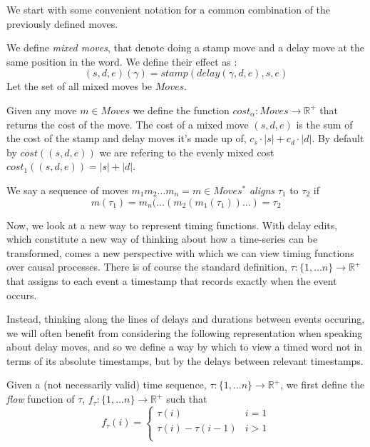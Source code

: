 \documentclass[runningheads]{llncs}
\newcounter{cases}
\begin{document}
	We start with some convenient notation for a common combination of the previously defined moves. 
	
	\begin{definition}
		We define \textit{mixed moves}, that denote doing a stamp move and a delay move at the same position in the word. 
		We define their effect as : $$(s, d, e)(\gamma) = stamp(delay(\gamma, d, e), s, e)$$
		Let the set of all mixed moves be $Moves$. 
	\end{definition}
	
	Given any move $m \in Moves$ we define the function $cost_{\alpha} : Moves \to \mathbb{R}^+$ that returns the cost of the move.  
	The cost of a mixed move $(s, d, e)$ is the sum of the cost of the stamp and delay moves it's made up of, $c_s\cdot|s| + c_d \cdot|d|$.
	By default by $cost((s, d, e))$ we are refering to the evenly mixed cost $cost_1((s, d, e)) = |s| + |d|$. 

	We say a sequence of moves $m_1m_2\dots m_n = m \in Moves^*$ \textit{aligns} $\tau_1$ to $\tau_2$ if $$m(\tau_1) = m_n(\dots (m_2(m_1(\tau_1))\dots) = \tau_2$$
	
Now, we look at a new way to represent timing functions. With delay edits, which constitute a new way of thinking about how a time-series can be transformed, comes a new perspective with which we can view timing functions over causal processes. 
	There is of course the standard definition, $\tau : \{1, \dots n\} \to \mathbb{R}^+$ that assigns to each event a timestamp that records exactly when the event occurs. 
	
	Instead, thinking along the lines of delays and durations between events occuring, we will often benefit from considering the following representation when speaking about delay moves, and so we define a way by which to view a timed word not in terms of its absolute timestamps, but by the delays between relevant timestamps. 
	
	\begin{definition}
		Given a (not necessarily valid) time sequence,  $\tau : \{1, \dots n\} \to \mathbb{R}^+$, we first define the \textit{flow} function of $\tau$, $f_{\tau} : \{1, \dots n\} \to \mathbb{R}^+$ such that 
		$$f_{\tau}(i) = \begin{cases} 
			\tau(i) & i = 1\\
			\tau(i) - \tau(i-1) &i > 1\\
		\end{cases}
		$$
		
	\end{definition}
	
\end{document}
